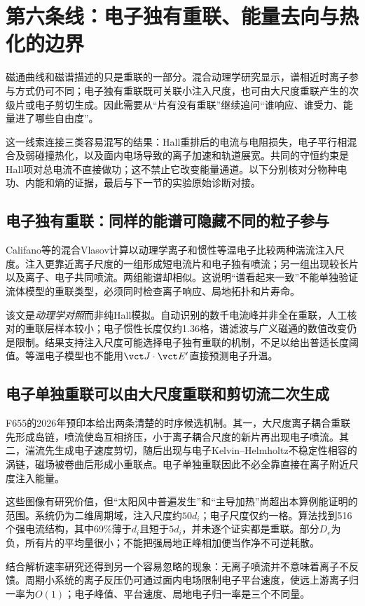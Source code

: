\documentclass[UTF8,a4paper,11pt,openany,fontset=fandol]{ctexbook}
\begin{document}
\section{第六条线：电子独有重联、能量去向与热化的边界}\label{story:energy}
磁通曲线和磁谱描述的只是重联的一部分。混合动理学研究显示，谱相近时离子参与方式仍可不同；电子独有重联既可关联小注入尺度，也可由大尺度重联产生的次级片或电子剪切生成。因此需要从“片有没有重联”继续追问“谁响应、谁受力、能量进了哪些自由度”。

这一线索连接三类容易混写的结果：Hall重排后的电流与电阻损失，电子平行相混合及弱碰撞热化，以及面内电场导致的离子加速和轨道展宽。共同的守恒约束是Hall项对总电流不直接做功；这不禁止它改变能量通道。以下分别核对分物种电功、内能和熵的证据，最后与下一节的实验原始诊断对接。

\subsection{电子独有重联：同样的能谱可隐藏不同的粒子参与}
Califano等的混合Vlasov计算以动理学离子和惯性等温电子比较两种湍流注入尺度。注入更靠近离子尺度的一组形成短电流片和电子独有喷流；另一组出现较长片以及离子、电子共同喷流。两组能谱却相似。这说明“谱看起来一致”不能单独验证流体模型的重联类型，必须同时检查离子响应、局地拓扑和片寿命。\citep{L267}

该文是\emph{动理学对照}而非纯Hall模拟。自动识别的数千电流峰并非全在重联，人工核对的重联层样本较小；电子惯性长度仅约1.36格，谱滤波与广义磁通的数值改变仍是限制。结果支持注入尺度可能选择电子独有重联的机制，不足以给出普适长度阈值。等温电子模型也不能用$\vct J\cdot\vct E'$直接预测电子升温。

\subsection{电子单独重联可以由大尺度重联和剪切流二次生成}
F655的2026年预印本\citep{F655}给出两条清楚的时序候选机制。其一，大尺度离子耦合重联先形成岛链，喷流使岛互相挤压，小于离子耦合尺度的新片再出现电子喷流。其二，湍流先生成电子速度剪切，随后出现与电子Kelvin--Helmholtz不稳定性相容的涡链，磁场被卷曲后形成小重联点。电子单独重联因此不必全靠直接在离子附近尺度注入能量。

这些图像有研究价值，但“太阳风中普遍发生”和“主导加热”尚超出本算例能证明的范围。系统仍为二维周期域，注入尺度约$50d_i$；电子尺度仅约一格。算法找到516个强电流结构，其中69\%薄于$d_i$且短于$5d_i$，并未逐个证实都是重联。部分$D_e$为负，所有片的平均量很小；不能把强局地正峰相加便当作净不可逆耗散。

结合解析速率研究\citep{F741}还得到另一个容易忽略的现象：无离子喷流并不意味着离子不反馈。周期小系统的离子反压仍可通过面内电场限制电子平台速度，使远上游离子归一率为$O(1)$；电子峰值、平台速度、局地电子归一率是三个不同量。
\end{document}

